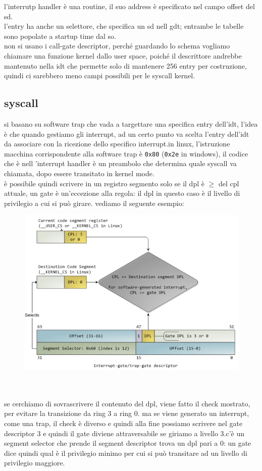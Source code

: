 \documentclass[12pt, oneside]{extbook} %
\begin{document}
l'interrutp handler è una routine, il suo address è specificato nel campo offset del sd.\\l'entry ha anche un selettore, che specifica un sd nell gdt; entrambe le tabelle sono popolate a startup time dal so.\\non si usano i call-gate descriptor, perché guardando lo schema vogliamo chiamare una funzione kernel dallo user space, poiché il descrittore andrebbe mantenuto nella idt che permette solo di mantenere 256 entry per costruzione, quindi ci sarebbero meno campi possibili per le syscall kernel.

\subsection{syscall}
si basano su software trap che vada a targettare una specifica entry dell'idt, l'idea è che quando gestiamo gli interrupt, ad un certo punto va scelta l'entry dell'idt da associare con la ricezione dello specifico interrupt.in linux, l'istruzione macchina corrispondente alla software trap è \texttt{0x80} (\texttt{0x2e} in windows), il codice che è nell 'interrupt handler è un preambolo che determina quale syscall va chiamata, dopo essere transitato in kernel mode.\\è possibile quindi scrivere in un registro segmento solo se il dpl è $\geq$ del cpl attuale, un gate è un'eccezione alla regola: il dpl in questo caso è il livello di privilegio a cui si può girare. vediamo il seguente esempio:\\
\begin{figure}[!h]
	\includegraphics[scale=0.3]{immagini/cpl_change.png}
\end{figure}\\\\
se cerchiamo di sovrascrivere il contenuto del dpl, viene fatto il check mostrato, per evitare la transizione da ring 3 a ring 0. ma se viene generato un interrupt, come una trap, il check è diverso e quindi alla fine possiamo scrivere nel gate descriptor 3 e quindi il gate diviene attraversabile se giriamo a livello 3.c'è un segment selector che prende il segment descriptor trova un dpl pari a 0: un gate dice quindi qual è il privilegio minimo per cui si può transitare ad un livello di privilegio maggiore.
\end{document}
